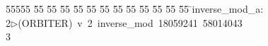 %
%
\begin{tabbing}
55555 \= 55 \= 55 \= 55 \= 55 \= 55 \= 55 \= 55 \= 55 \= 55 \= 55 \= 55 \= 55 \= \>inverse\_mod\_a:\\[0pt]
2\>$\triangleright$\>(ORBITER)\ v\ 2\ inverse\_mod\ 18059241\ 58014043\\[0pt]
3\>\end{tabbing}
